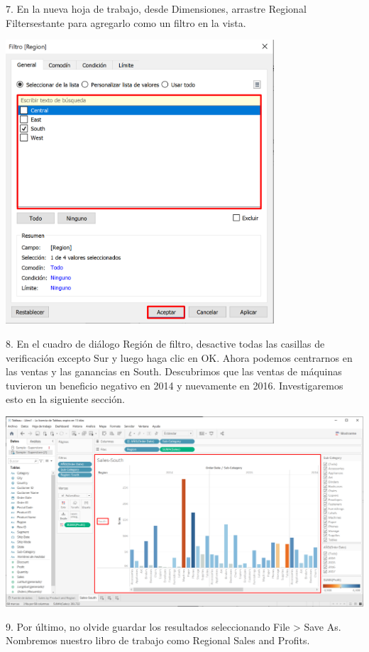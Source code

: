 \documentclass[12pt,letterpaper]{article}
\begin{document}
7. En la nueva hoja de trabajo, desde Dimensiones, arrastre Regional Filtersestante para
agregarlo como un filtro en la vista.
\begin{center}
    \includegraphics[width=10cm]{img/19.png}  
\end{center}
8. En el cuadro de diálogo Región de filtro, desactive todas las casillas de verificación excepto Sur
y luego haga clic en OK. Ahora podemos centrarnos en las ventas y las ganancias
en South. Descubrimos que las ventas de máquinas tuvieron un beneficio negativo en 2014 y
nuevamente en 2016. Investigaremos esto en la siguiente sección.
\begin{center}
    \includegraphics[width=16cm]{img/20.png}  
\end{center}
9. Por último, no olvide guardar los resultados seleccionando File > Save As. Nombremos
nuestro libro de trabajo como Regional Sales and Profits.
\end{document}
